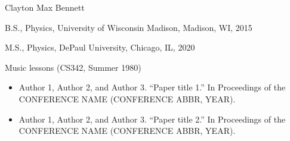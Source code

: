 \vita
\begin{singlespace}
    \begin{description}[labelwidth=4cm,leftmargin=4.2cm,itemsep=1em]

        \item[NAME] Clayton Max Bennett

        \item[EDUCATION] B.S., Physics, University of Wisconsin Madison, Madison, WI, 2015
        \item[EDUCATION] M.S., Physics, DePaul University, Chicago, IL, 2020
          
        \item[TEACHING] Music lessons (CS342, Summer 1980)

        \item[PUBLICATIONS]
            \begin{itemize}[label={},listparindent=0pt,itemindent=0pt,leftmargin=0pt,itemsep=1em,parsep=0pt,topsep=0pt,partopsep=0pt]

                \item Author 1, Author 2, and Author 3. %
                ``Paper title 1.'' %
                In Proceedings of the CONFERENCE NAME (CONFERENCE ABBR, YEAR).

                \item Author 1, Author 2, and Author 3. %
                ``Paper title 2.'' %
                In Proceedings of the CONFERENCE NAME (CONFERENCE ABBR, YEAR).

            \end{itemize}
    \end{description}
\end{singlespace}

